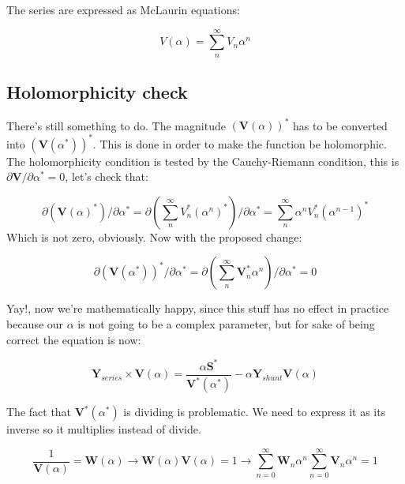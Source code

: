 \documentclass[a4paper,twoside,fleqn]{tufte-book}
\begin{document}
The series are expressed as McLaurin equations:

\begin{equation}
V(\alpha) = \sum_{n}^{\infty} V_n \alpha ^n
\label{eq:McLaurinV}
\end{equation}

\subsection{Holomorphicity check}
	
	There's still something to do. The magnitude $\left(\textbf{V}( \alpha )\right)^*$ has to be converted into $\left(\textbf{V}( \alpha^* )\right)^*$. This is done in order to make the function be holomorphic. The holomorphicity condition is tested by the Cauchy-Riemann condition, this is $\partial \textbf{V} / \partial \alpha^* = 0$, let's check that:
	
	\begin{equation}
	\partial \left(\textbf{V}( \alpha )^*\right) / \partial \alpha^*  = \partial \left(\sum_{n}^{\infty} V_n^* (\alpha ^n)^*\right) / \partial \alpha^*  = \sum_{n}^{\infty} \alpha ^n V_n^* (\alpha ^{n-1})^*
	\end{equation} 
	Which is not zero, obviously. Now with the proposed change:
	
	\begin{equation}
	\partial \left( \textbf{V}( \alpha^* )\right)^* / \partial \alpha^*  = \partial \left(\sum_{n}^{\infty} \textbf{V}_n^* \alpha ^n \right) / \partial \alpha^*  = 0
	\end{equation} 
	
	Yay!, now we're mathematically happy, since this stuff has no effect in practice because our $\alpha$ is not going to be a complex parameter, but for sake of being correct the equation is now:
	
	\begin{equation}
	{\textbf{Y}_{series}\times \textbf{V}( \alpha )} = \frac{ \alpha\textbf{S}^*}{\textbf{V}^*( \alpha^* )} - \alpha \textbf{Y}_{shunt} \textbf{V}( \alpha )
	\label{base_eq_embedded2}
	\end{equation}
	



The fact that $\textbf{V}^*( \alpha^* )$ is dividing is problematic. We need to express it as its inverse so it multiplies instead of divide.

\begin{equation} 
\frac{1}{\textbf{V}( \alpha)} = \textbf{W}( \alpha ) \longrightarrow \textbf{W}( \alpha ) \textbf{V}( \alpha) = 1 \longrightarrow \sum_{n=0}^{\infty}{\textbf{W}_n \alpha^n}  \sum_{n=0}^{\infty}{\textbf{V}_n \alpha^n} = 1
\end{equation}
\end{document}
